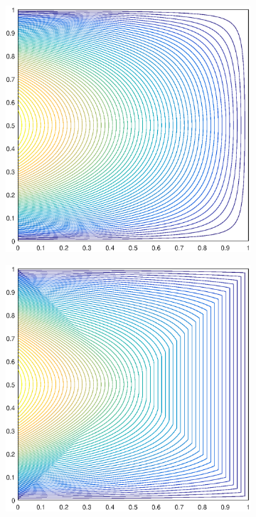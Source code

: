\documentclass[11pt]{article}
\begin{document}
\begin{figure}
\label{fig::2D_Quadratic_Summary_unit_square_basis_functions_b8}
\centering
	\begin{subfigure}[b]{0.25\textwidth}
		\centering
		\includegraphics[width=\textwidth]{figures/square_WACHSPRESS2_contour_b8.eps}
		\caption{}
	\end{subfigure}
	\hspace{1cm}
	\begin{subfigure}[b]{0.25\textwidth}
		\centering
		\includegraphics[width=\textwidth]{figures/square_PWLD2_contour_b8.eps}

\end{subfigure}
\end{figure}
\end{document}
